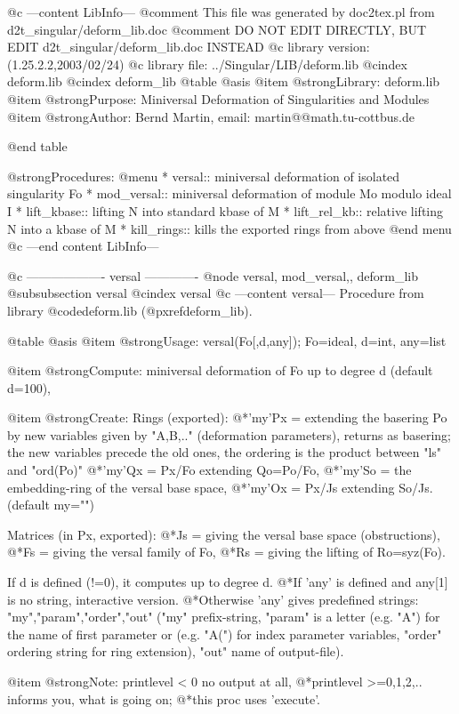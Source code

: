 @c ---content LibInfo---
@comment This file was generated by doc2tex.pl from d2t_singular/deform_lib.doc
@comment DO NOT EDIT DIRECTLY, BUT EDIT d2t_singular/deform_lib.doc INSTEAD
@c library version: (1.25.2.2,2003/02/24)
@c library file: ../Singular/LIB/deform.lib
@cindex deform.lib
@cindex deform_lib
@table @asis
@item @strong{Library:}
deform.lib
@item @strong{Purpose:}
    Miniversal Deformation of Singularities and Modules
@item @strong{Author:}
Bernd Martin, email: martin@@math.tu-cottbus.de

@end table

@strong{Procedures:}
@menu
* versal:: miniversal deformation of isolated singularity Fo
* mod_versal:: miniversal deformation of module Mo modulo ideal I
* lift_kbase:: lifting N into standard kbase of M
* lift_rel_kb:: relative lifting N into a kbase of M
* kill_rings:: kills the exported rings from above
@end menu
@c ---end content LibInfo---

@c ------------------- versal -------------
@node versal, mod_versal,, deform_lib
@subsubsection versal
@cindex versal
@c ---content versal---
Procedure from library @code{deform.lib} (@pxref{deform_lib}).

@table @asis
@item @strong{Usage:}
versal(Fo[,d,any]); Fo=ideal, d=int, any=list

@item @strong{Compute:}
miniversal deformation of Fo up to degree d (default d=100),

@item @strong{Create:}
Rings (exported):
@*'my'Px = extending the basering Po by new variables given by
"A,B,.." (deformation parameters), returns as basering; the
new variables precede the old ones, the ordering is the
product between "ls" and "ord(Po)"
@*'my'Qx = Px/Fo extending Qo=Po/Fo,
@*'my'So = the embedding-ring of the versal base space,
@*'my'Ox = Px/Js extending So/Js. (default my="")

Matrices (in Px, exported):
@*Js = giving the versal base space (obstructions),
@*Fs = giving the versal family of Fo,
@*Rs = giving the lifting of Ro=syz(Fo).

If d is defined (!=0), it computes up to degree d.
@*If 'any' is defined and any[1] is no string, interactive version.
@*Otherwise 'any' gives predefined strings: "my","param","order","out"
("my" prefix-string, "param" is a letter (e.g. "A") for the name of
first parameter or (e.g. "A(") for index parameter variables, "order"
ordering string for ring extension), "out" name of output-file).

@item @strong{Note:}
printlevel < 0 no output at all,
@*printlevel >=0,1,2,.. informs you, what is going on;
@*this proc uses 'execute'.

